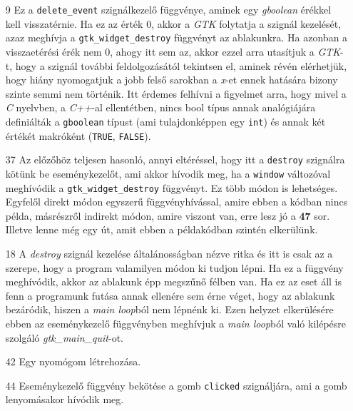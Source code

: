 \begin{enumerate}
 \item[9] Ez a \texttt{delete\_event} szignálkezelő függvénye, aminek egy \textit{gboolean} érékkel kell visszatérnie. Ha ez az érték 0, akkor a \textit{GTK} folytatja a szignál kezelését, azaz meghívja a \texttt{gtk\_widget\_destroy} függvényt az ablakunkra. Ha azonban a visszaetérési érék nem 0, ahogy itt sem az, akkor ezzel arra utasítjuk a \textit{GTK}-t, hogy a szignál további feldolgozásától tekintsen el, aminek révén elérhetjük, hogy hiány nyomogatjuk a jobb felső sarokban a \textit{x}-et ennek hatására bizony szinte semmi nem történik. Itt érdemes felhívni a figyelmet arra, hogy mivel a \textit{C} nyelvben, a \textit{C++}-al ellentétben, nincs bool típus annak analógiájára definiálták a \texttt{gboolean} típust (ami tulajdonképpen egy \texttt{int}) és annak két értékét makróként (\texttt{TRUE}, \texttt{FALSE}).

 \item[37] Az előzőhöz teljesen hasonló, annyi eltéréssel, hogy itt a \texttt{destroy} szignálra kötünk be eseménykezelőt, ami akkor hívodik meg, ha a \texttt{window} változóval meghívódik a \texttt{gtk\_widget\_destroy} függvényt. Ez több módon is lehetséges. Egyfelől direkt módon egyszerű függvényhívással, amire ebben a kódban nincs példa, másrészről indirekt módon, amire viszont van, erre lesz jó a \textbf{47} sor. Illetve lenne még egy út, amit ebben a példakódban szintén elkerülünk.

 \item[18] A \textit{destroy} szignál kezelése általánosságban nézve ritka és itt is csak az a szerepe, hogy a program valamilyen módon ki tudjon lépni. Ha ez a függvény meghívódik, akkor az ablakunk épp megszűnő félben van. Ha ez az eset áll is fenn a programunk futása annak ellenére sem érne véget, hogy az ablakunk bezáródik, hiszen a \textit{main loop}ból nem lépnénk ki. Ezen helyzet elkerülésére ebben az eseménykezelő függvényben meghívjuk a \textit{main loop}ból való kilépésre szolgáló \textit{gtk\_main\_quit}-ot.

 \item[42] Egy nyomógom létrehozása.

 \item[44] Eseménykezelő függvény bekötése a gomb \texttt{clicked} szignáljára, ami a gomb lenyomásakor hívódik meg.


\end{enumerate}
